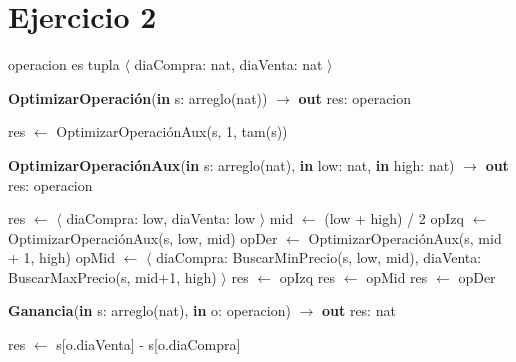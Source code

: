 \section*{Ejercicio 2}

operacion es tupla $\langle$ diaCompra: nat, diaVenta: nat $\rangle$

\begin{algorithm}[H]
\caption{
    \textbf{OptimizarOperación}(\textbf{in} s: arreglo(nat)) $\to$ \textbf{out} res: operacion
}
\begin{algorithmic}[1]
    \State res $\gets$ OptimizarOperaciónAux(s, 1, tam(s))
\end{algorithmic}
\end{algorithm}

\begin{algorithm}[H]
\caption{
    \textbf{OptimizarOperaciónAux}(\textbf{in} s: arreglo(nat), \textbf{in} low: nat, \textbf{in} high: nat) $\to$ \textbf{out} res: operacion
}
\begin{algorithmic}[1]
        \State res $\gets$ $\langle$ diaCompra: low, diaVenta: low $\rangle$
    \Else
        \State mid $\gets$ (low + high) / 2
        \State opIzq $\gets$ OptimizarOperaciónAux(s, low, mid)
        \State opDer $\gets$ OptimizarOperaciónAux(s, mid + 1, high)
        \State opMid $\gets$ $\langle$ diaCompra: BuscarMinPrecio(s, low, mid), diaVenta: BuscarMaxPrecio(s, mid+1, high) $\rangle$
            \State res $\gets$ opIzq
            \State res $\gets$ opMid
        \Else
            \State res $\gets$ opDer
        \EndIf
    \EndIf
\end{algorithmic}
\end{algorithm}

\begin{algorithm}[H]
\caption{
    \textbf{Ganancia}(\textbf{in} s: arreglo(nat), \textbf{in} o: operacion) $\to$ \textbf{out} res: nat
}
\begin{algorithmic}[1]
    \State res $\gets$ s[o.diaVenta] - s[o.diaCompra]
\end{algorithmic}
\end{algorithm}
